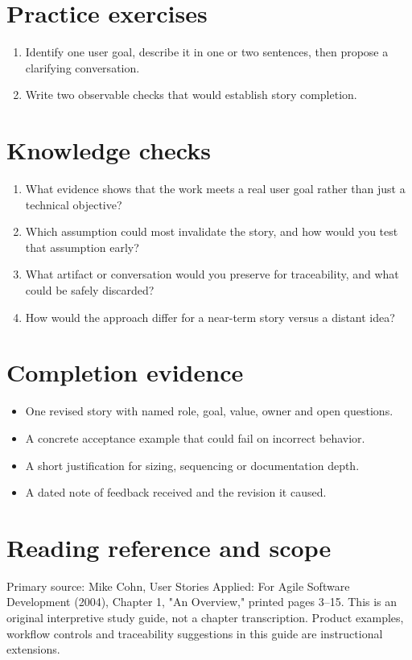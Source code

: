 \documentclass[11pt,letterpaper]{article}
\begin{document}
\section{Practice exercises}
\begin{enumerate}[leftmargin=*,itemsep=3pt]
\item Identify one user goal, describe it in one or two sentences, then propose a clarifying conversation.
\item Write two observable checks that would establish story completion.
\end{enumerate}
\section{Knowledge checks}
\begin{enumerate}[leftmargin=*,itemsep=3pt]
\item What evidence shows that the work meets a real user goal rather than just a technical objective?
\item Which assumption could most invalidate the story, and how would you test that assumption early?
\item What artifact or conversation would you preserve for traceability, and what could be safely discarded?
\item How would the approach differ for a near-term story versus a distant idea?
\end{enumerate}
\section{Completion evidence}
\begin{itemize}[leftmargin=*,itemsep=2pt]
\item One revised story with named role, goal, value, owner and open questions.
\item A concrete acceptance example that could fail on incorrect behavior.
\item A short justification for sizing, sequencing or documentation depth.
\item A dated note of feedback received and the revision it caused.
\end{itemize}
\section{Reading reference and scope}
Primary source: Mike Cohn, User Stories Applied: For Agile Software Development (2004), Chapter 1, "An Overview," printed pages 3–15. This is an original interpretive study guide, not a chapter transcription. Product examples, workflow controls and traceability suggestions in this guide are instructional extensions.
\end{document}
